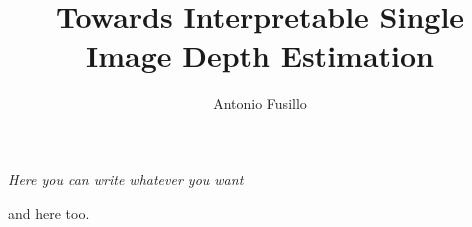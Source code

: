 \documentclass{styles/tthesis}
\title{Towards Interpretable Single Image Depth Estimation}
\author{Antonio Fusillo}
\begin{document}


\printfrontpage




\chapter*{\mbox{}}

\begin{flushright}
\thispagestyle{empty}
\null{}
{\it Here you can write whatever you want

\vspace{10pt}
and here too.
}
\null
\end{flushright}
%
\thispagestyle{empty}
\mbox{}
\newpage





\tableofcontents

\mainmatter









\label{Bibliography}


\end{document}
